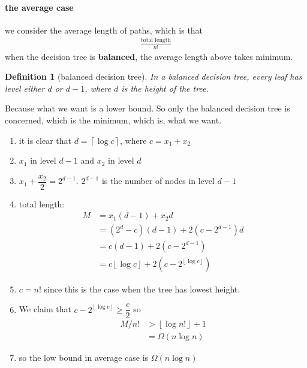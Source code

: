 \documentclass[a4paper, 10pt]{ctexart} %
\newtheorem{definition}{Definition}
\begin{document}
\paragraph{the average case} %
\label{par:the average case}
we consider the average length of paths, which is that 
\begin{align*}
    \frac{ \text{total length}}{n !}
\end{align*}
when the decision tree is \textbf{balanced}, the average length above takes minimum. 

\begin{definition}[balanced decision tree]
In a balanced decision tree, every leaf has level either $d$ or $d - 1$, where $d$ is the 
height of the tree.
\end{definition}

Because what we want is a lower bound. So 
only the balanced decision tree is concerned,
which is the minimum, which is, what we want. 

\begin{enumerate}
    \item it is clear that $d = \left\lceil \log  c \right\rceil$, where $c = x_{1} + x_{2}$
    \item $x_{1}$ in level $d - 1$ and $x_{2} $ in level $d$
    \item $x_{1} + \dfrac{x_2}{2} = 2^{d-1}$. $2 ^{d- 1}$ is the number of nodes in 
    level $d  -1$
    \item total length:
    \begin{align*}
        M & = x _{1} \left(d - 1\right)  +x_{2} d  \\ 
        & = \left(2 ^{d} - c     \right) \left(d - 1\right) + 2 \left( c - 2 ^{d-1}\right) d \\
        & = c \left(d - 1\right) + 2 \left( c - 2 ^{d-1}\right) \tag{$d- 1  = \left\lfloor  \log c \right\rfloor$} \\
        & = c \left\lfloor \log  c \right\rfloor + 2 \left(c - 2 ^{\left\lfloor \log c \right\rfloor}\right)
    \end{align*}
    \item $c = n!$ since this is the case when the tree has lowest height. 
    \item We claim that $c  - 2 ^{\left\lfloor \log  c \right\rfloor } \ge \dfrac{c}{2}$ so 
    \begin{align*}
        M / n ! & > \left\lfloor \log n ! \right\rfloor + 1 \\
        & = \Omega \left( n \log  n\right)
    \end{align*}
    \item so the low bound in average case is $\Omega \left( n \log n\right)$
\end{enumerate}
\end{document}
